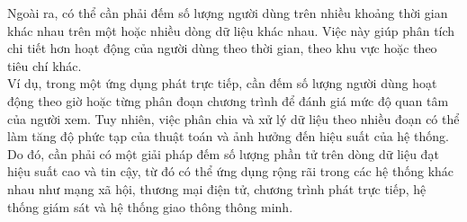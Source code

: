 \documentclass[letterpaper,13pt]{article}
\theoremstyle{mytheor}
\begin{document}
Ngoài ra, có thể cần phải đếm số lượng người dùng trên nhiều khoảng thời gian khác nhau trên một hoặc nhiều dòng dữ liệu khác nhau. 
Việc này giúp phân tích chi tiết hơn hoạt động của người dùng theo thời gian, theo khu vực hoặc theo tiêu chí khác.\\
Ví dụ, trong một ứng dụng phát trực tiếp, cần đếm số lượng người dùng hoạt động theo giờ hoặc từng phân đoạn chương trình 
để đánh giá mức độ quan tâm của người xem. Tuy nhiên, việc phân chia và xử lý dữ liệu theo nhiều đoạn có thể làm 
tăng độ phức tạp của thuật toán và ảnh hưởng đến hiệu suất của hệ thống. Do đó, cần phải có một giải pháp 
đếm số lượng phần tử trên dòng dữ liệu đạt hiệu suất cao và tin cậy, từ đó có thể ứng dụng rộng rãi trong các 
hệ thống khác nhau như mạng xã hội, thương mại điện tử, chương trình phát trực tiếp, hệ thống giám sát 
và hệ thống giao thông thông minh.
\newpage
\end{document}
